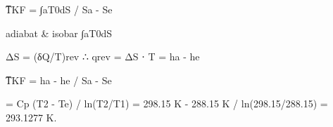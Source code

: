 T̅KF = ∫aT0dS / Sa - Se  

adiabat & isobar ∫aT0dS  

ΔS = (δQ/T)rev  
∴ qrev = ΔS ⋅ T = ha - he  

T̅KF = ha - he / Sa - Se  

= Cp (T2 - Te) / ln(T2/T1)  
= 298.15 K - 288.15 K / ln(298.15/288.15) = 293.1277 K.